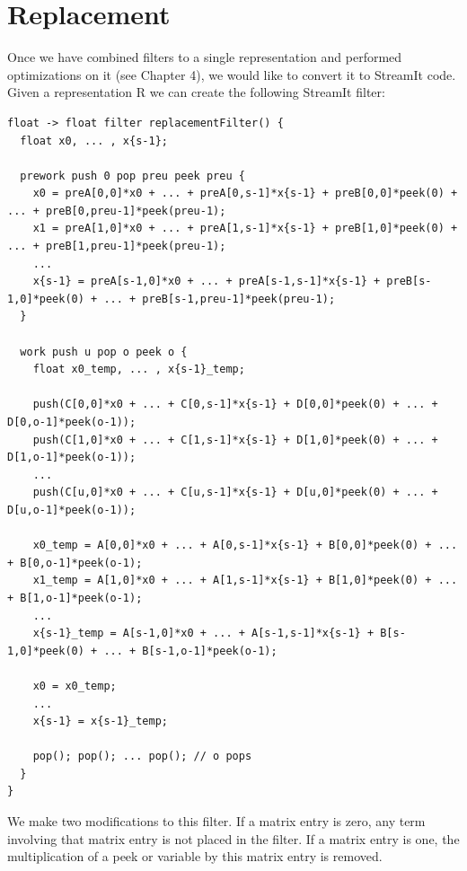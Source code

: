 \section{Replacement}

    Once we have combined filters to a single representation and
performed optimizations on it (see Chapter 4), we would like to
convert it to StreamIt code. Given a representation $\mathrm{R}$
we can create the following StreamIt filter:

\begin{scriptsize}
\begin{verbatim}
float -> float filter replacementFilter() {
  float x0, ... , x{s-1};

  prework push 0 pop preu peek preu {
    x0 = preA[0,0]*x0 + ... + preA[0,s-1]*x{s-1} + preB[0,0]*peek(0) + ... + preB[0,preu-1]*peek(preu-1);
    x1 = preA[1,0]*x0 + ... + preA[1,s-1]*x{s-1} + preB[1,0]*peek(0) + ... + preB[1,preu-1]*peek(preu-1);
    ...
    x{s-1} = preA[s-1,0]*x0 + ... + preA[s-1,s-1]*x{s-1} + preB[s-1,0]*peek(0) + ... + preB[s-1,preu-1]*peek(preu-1);
  }

  work push u pop o peek o {
    float x0_temp, ... , x{s-1}_temp;

    push(C[0,0]*x0 + ... + C[0,s-1]*x{s-1} + D[0,0]*peek(0) + ... + D[0,o-1]*peek(o-1));
    push(C[1,0]*x0 + ... + C[1,s-1]*x{s-1} + D[1,0]*peek(0) + ... + D[1,o-1]*peek(o-1));
    ...
    push(C[u,0]*x0 + ... + C[u,s-1]*x{s-1} + D[u,0]*peek(0) + ... + D[u,o-1]*peek(o-1));

    x0_temp = A[0,0]*x0 + ... + A[0,s-1]*x{s-1} + B[0,0]*peek(0) + ... + B[0,o-1]*peek(o-1);
    x1_temp = A[1,0]*x0 + ... + A[1,s-1]*x{s-1} + B[1,0]*peek(0) + ... + B[1,o-1]*peek(o-1);
    ...
    x{s-1}_temp = A[s-1,0]*x0 + ... + A[s-1,s-1]*x{s-1} + B[s-1,0]*peek(0) + ... + B[s-1,o-1]*peek(o-1);

    x0 = x0_temp;
    ...
    x{s-1} = x{s-1}_temp;

    pop(); pop(); ... pop(); // o pops
  }
}
\end{verbatim}
\end{scriptsize}

    We make two modifications to this filter. If a matrix entry is
zero, any term involving that matrix entry is not placed in the
filter. If a matrix entry is one, the multiplication of a peek or
variable by this matrix entry is removed.
